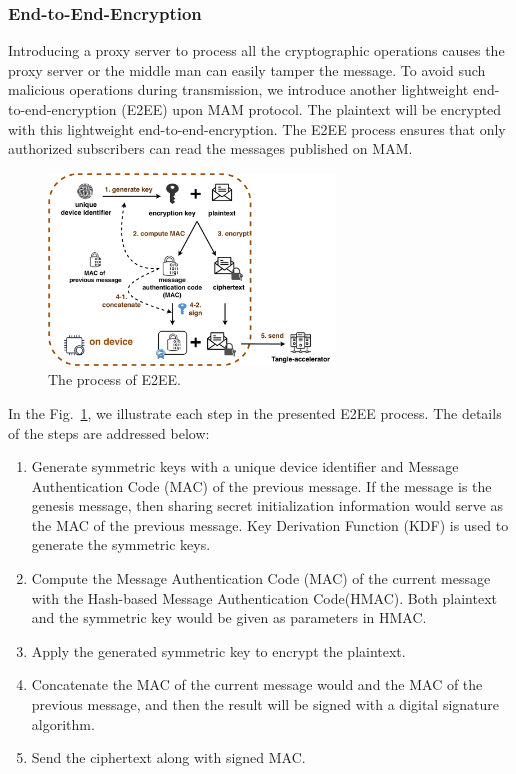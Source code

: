 \documentclass[10pt, conference, compsocconf]{IEEEtran}
\begin{document}
\subsubsection{End-to-End-Encryption}
Introducing a proxy server to process all the cryptographic operations causes the proxy server or the middle man can easily tamper the message. To avoid such malicious operations during transmission, we introduce another lightweight end-to-end-encryption (E2EE) upon MAM protocol. The plaintext will be encrypted with this lightweight end-to-end-encryption. The E2EE process ensures that only authorized subscribers can read the messages published on MAM.

\begin{figure}[!h]
    \centering
    \includegraphics[width=3in]{MAM_E2EE_fold}
    \caption{The process of E2EE.}
    \label{fig:MAM_E2EE}
\end{figure}

In the Fig.~\ref{fig:MAM_E2EE}, we illustrate each step in the presented E2EE process. The details of the steps are addressed below:

\begin{enumerate}
    \item Generate symmetric keys with a unique device identifier and Message Authentication Code (MAC) of the previous message. If the message is the genesis message, then sharing secret initialization information would serve as the MAC of the previous message. Key Derivation Function (KDF) is used to generate the symmetric keys.
    \item Compute the Message Authentication Code (MAC) of the current message with the Hash-based Message Authentication Code(HMAC). Both plaintext and the symmetric key would be given as parameters in HMAC.
    \item Apply the generated symmetric key to encrypt the plaintext.
    \item Concatenate the MAC of the current message would and the MAC of the previous message, and then the result will be signed with a digital signature algorithm.
    \item Send the ciphertext along with signed MAC.
\end{enumerate}
\end{document}
